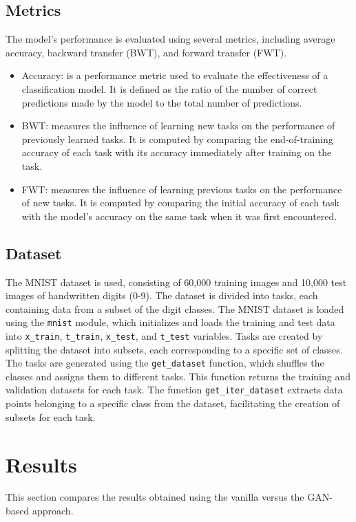 \documentclass{article}
\begin{document}
\subsection{Metrics}
The model's performance is evaluated using several metrics, including average accuracy, backward transfer (BWT), and forward transfer (FWT).
\begin{itemize}
    \item Accuracy: is a performance metric used to evaluate the effectiveness of a classification model. It is defined as the ratio of the number of correct predictions made by the model to the total number of predictions.

    \item BWT: measures the influence of learning new tasks on the performance of previously learned tasks. It is computed by comparing the end-of-training accuracy of each task with its accuracy immediately after training on the task.
    
    \item FWT: measures the influence of learning previous tasks on the performance of new tasks. It is computed by comparing the initial accuracy of each task with the model's accuracy on the same task when it was first encountered.
\end{itemize}

\subsection{Dataset}
The MNIST dataset is used, consisting of 60,000 training images and 10,000 test images of handwritten digits (0-9). The dataset is divided into tasks, each containing data from a subset of the digit classes.
%
The MNIST dataset is loaded using the \texttt{mnist} module, which initializes and loads the training and test data into \texttt{x\_train}, \texttt{t\_train}, \texttt{x\_test}, and \texttt{t\_test} variables.
%
Tasks are created by splitting the dataset into subsets, each corresponding to a specific set of classes. The tasks are generated using the \texttt{get\_dataset} function, which shuffles the classes and assigns them to different tasks. This function returns the training and validation datasets for each task.
%
The function \texttt{get\_iter\_dataset} extracts data points belonging to a specific class from the dataset, facilitating the creation of subsets for each task.




\section{Results}
This section compares the results obtained using the vanilla versus the GAN-based approach. 
\end{document}
